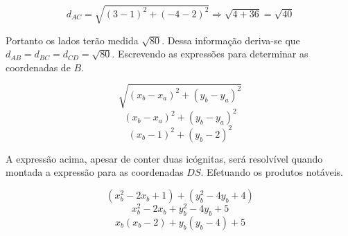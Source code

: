 \documentclass[11pt]{memoir}
\begin{document}
\begin{equation}
  d_{AC} = \sqrt{(3 - 1)^{2} + (-4 - 2)^{2}} \Rightarrow \sqrt{4 + 36} = \sqrt{40}
\end{equation}

Portanto os lados terão medida $\sqrt{80}$. Dessa informação deriva-se que $d_{AB} = d_{BC} = d_{CD} = \sqrt{80}$. Escrevendo as expressões para determinar as coordenadas de $B$.

\[\sqrt{(x_{b} - x_{a})^{2} + (y_{b} - y_{a})^{2}}\]
\[(x_{b} - x_{a})^{2} + (y_{b} - y_{a})^{2}\]
\[(x_{b} - 1)^{2} + (y_{b} - 2)^{2}\]

A expressão acima, apesar de conter duas icógnitas, será resolvível quando montada a expressão para as coordenadas $DS$. Efetuando os produtos notáveis.

\[(x_{b}^{2} - 2x_{b} + 1) + (y_{b}^{2} - 4y_{b} + 4)\]
\[x_{b}^{2} - 2x_{b}  + y_{b}^{2} - 4y_{b} + 5\]
\[x_{b}(x_{b} - 2) + y_{b}(y_{b} - 4) + 5\]
\end{document}
